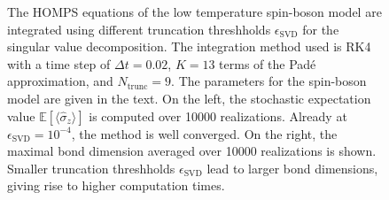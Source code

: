 \begin{figure}[H]
\begin{subfigure}[b]{0.471\textwidth}
    \end{subfigure}
    \caption{The HOMPS equations of the low temperature spin-boson model are integrated using different truncation threshholds $\epsilon_{\text{SVD}}$ for the singular value decomposition. 
    The integration method used is RK4 with a time step of $\Delta t = 0.02$, $K=13$ terms of the Padé approximation, and $N_\text{trunc} = 9$. 
    The parameters for the spin-boson model are given in the text. On the left, the stochastic
    expectation value $\mathbb{E}\left\lbrack\langle\hat{\sigma}_z\rangle\right\rbrack$ is computed over 10000 realizations. Already at $\epsilon_\text{SVD}=10^{-4}$, the method
    is well converged. On the right, the maximal bond dimension averaged over 10000 realizations is shown. Smaller truncation threshholds $\epsilon_\text{SVD}$
    lead to larger bond dimensions, giving rise to higher computation times.}
    \label{fig:homps_low_T_eps_convergence_sigma_z_and_max_bond_dim} 
\end{figure}